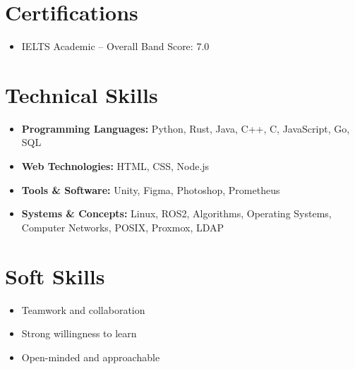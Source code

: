 \documentclass[11pt,a4paper]{article}
\begin{document}
\section*{Certifications}
\begin{itemize}
    \item IELTS Academic -- Overall Band Score: 7.0
\end{itemize}

\section*{Technical Skills}
\begin{itemize}[label={}, leftmargin=2em] %
    \item \textbf{Programming Languages:} Python, Rust, Java, C++, C, JavaScript, Go, SQL
    \item \textbf{Web Technologies:} HTML, CSS, Node.js
    \item \textbf{Tools \& Software:} Unity, Figma, Photoshop, Prometheus
    \item \textbf{Systems \& Concepts:} Linux, ROS2, Algorithms, Operating Systems, Computer Networks, POSIX, Proxmox, LDAP
\end{itemize}

\section*{Soft Skills}
\begin{itemize}
    \item Teamwork and collaboration
    \item Strong willingness to learn
    \item Open-minded and approachable
\end{itemize}
\end{document}

